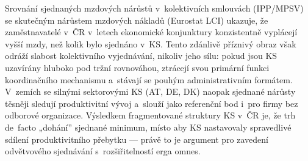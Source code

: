 Srovnání sjednaných mzdových nárůstů v~kolektivních smlouvách (\ac{IPP}/\ac{MPSV}) se skutečným nárůstem mzdových nákladů (Eurostat \ac{LCI}) ukazuje, že zaměstnavatelé v~ČR v~letech ekonomické konjunktury konzistentně vyplácejí vyšší mzdy, než kolik bylo sjednáno v~\ac{KS}.
Tento zdánlivě příznivý obraz však odráží slabost kolektivního vyjednávání, nikoliv jeho sílu: pokud jsou \ac{KS} uzavírány hluboko pod tržní rovnováhou, ztrácejí svou primární funkci koordinačního mechanismu a~stávají se pouhým administrativním formátem.
V~zemích se silnými sektorovými \ac{KS} (AT, DE, DK) naopak sjednané nárůsty těsněji sledují produktivitní vývoj a~slouží jako referenční bod i~pro firmy bez odborové organizace.
Výsledkem fragmentované struktury \ac{KS} v~ČR je, že trh de~facto „dohání” sjednané minimum, místo aby \ac{KS} nastavovaly spravedlivé sdílení produktivitního přebytku --- právě to je argument pro zavedení odvětvového sjednávání s~rozšiřitelností erga omnes.


